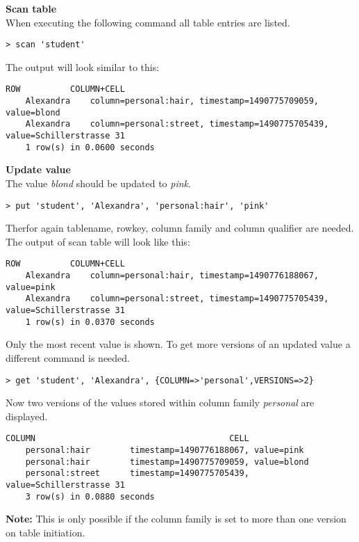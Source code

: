 \textbf{Scan table} \\
When executing the following command all table entries are listed.
\begin{lstlisting}[caption={scan table},label=lst:scan_table]
	> scan 'student'
\end{lstlisting}

The output will look similar to this:

\begin{lstlisting}[caption={output of the table scan 1},label=lst:table_scan_output]
	ROW          COLUMN+CELL
	Alexandra    column=personal:hair, timestamp=1490775709059, value=blond
	Alexandra    column=personal:street, timestamp=1490775705439, value=Schillerstrasse 31
	1 row(s) in 0.0600 seconds
\end{lstlisting}

\textbf{Update value} \\
The value \textit{blond} should be updated to \textit{pink}.
\begin{lstlisting}[caption={update value},label=lst:update_value]
	> put 'student', 'Alexandra', 'personal:hair', 'pink'
\end{lstlisting}
Therfor again tablename, rowkey, column family and column qualifier are needed.
The output of scan table will look like this:
\begin{lstlisting}[caption={output of the table scan 2},label=lst:table_scan_output_2]
	ROW          COLUMN+CELL
	Alexandra    column=personal:hair, timestamp=1490776188067, value=pink
	Alexandra    column=personal:street, timestamp=1490775705439, value=Schillerstrasse 31
	1 row(s) in 0.0370 seconds
\end{lstlisting}

Only the most recent value is shown. To get more versions of an updated value a different command is needed.

\begin{lstlisting}[caption={get multiple versions},label=lst:get_multiple_versions]
	> get 'student', 'Alexandra', {COLUMN=>'personal',VERSIONS=>2}
\end{lstlisting}

Now two versions of the values stored within column family \textit{personal} are displayed.
\begin{lstlisting}[caption={output of the table scan 3},label=lst:table_scan_output_3]
	COLUMN                                       CELL
	personal:hair        timestamp=1490776188067, value=pink
	personal:hair        timestamp=1490775709059, value=blond
	personal:street      timestamp=1490775705439, value=Schillerstrasse 31
	3 row(s) in 0.0880 seconds
\end{lstlisting}
\textbf{Note:} This is only possible if the column family is set to more than one version on table initiation. 

